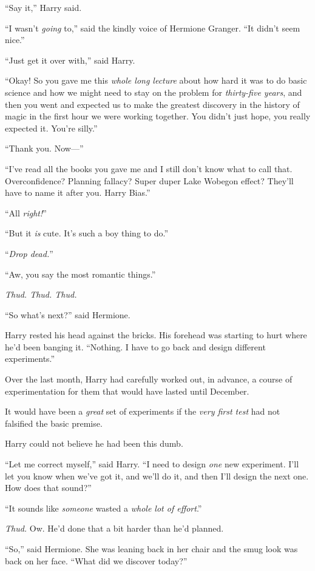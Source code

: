 “Say it,” Harry said.

“I wasn’t \emph{going} to,” said the kindly voice of Hermione Granger. “It didn’t seem nice.”

“Just get it over with,” said Harry.

“Okay! So you gave me this \emph{whole long lecture} about how hard it was to do basic science and how we might need to stay on the problem for \emph{thirty-five years}, and then you went and expected us to make the greatest discovery in the history of magic in the first hour we were working together. You didn’t just hope, you really expected it. You’re silly.”

“Thank you. Now—”

“I’ve read all the books you gave me and I still don’t know what to call that. Overconfidence? Planning fallacy? Super duper Lake Wobegon effect? They’ll have to name it after you. Harry Bias.”

“All \emph{right!}”

“But it \emph{is} cute. It’s such a boy thing to do.”

“\emph{Drop dead.}”

“Aw, you say the most romantic things.”

\emph{Thud. Thud. Thud.}

“So what’s next?” said Hermione.

Harry rested his head against the bricks. His forehead was starting to hurt where he’d been banging it. “Nothing. I have to go back and design different experiments.”

Over the last month, Harry had carefully worked out, in advance, a course of experimentation for them that would have lasted until December.

It would have been a \emph{great} set of experiments if the \emph{very first test} had not falsified the basic premise.

Harry could not believe he had been this dumb.

“Let me correct myself,” said Harry. “I need to design \emph{one} new experiment. I’ll let you know when we’ve got it, and we’ll do it, and then I’ll design the next one. How does that sound?”

“It sounds like \emph{someone} wasted a \emph{whole lot of effort}.”

\emph{Thud.} Ow. He’d done that a bit harder than he’d planned.

“So,” said Hermione. She was leaning back in her chair and the smug look was back on her face. “What did we discover today?”

